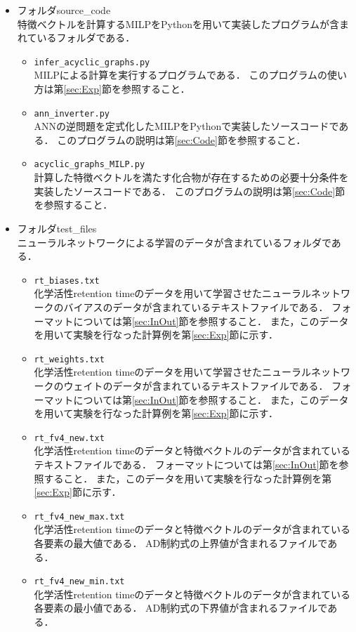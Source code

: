 \documentclass[11pt,titlepage,dvipdfmx,twoside]{jarticle}
\begin{document}
\begin{itemize}

\item フォルダsource\_code\\
特徴ベクトルを計算するMILPをPythonを用いて実装したプログラムが含まれているフォルダである．
\begin{itemize}
\item {\tt infer\_acyclic\_graphs.py}\\
MILPによる計算を実行するプログラムである．
このプログラムの使い方は第\ref{sec:Exp}節を参照すること．
\item {\tt ann\_inverter.py}\\
ANNの逆問題を定式化したMILPをPythonで実装したソースコードである．
このプログラムの説明は第\ref{sec:Code}節を参照すること．
\item {\tt acyclic\_graphs\_MILP.py}\\
計算した特徴ベクトルを満たす化合物が存在するための必要十分条件を実装したソースコードである．
このプログラムの説明は第\ref{sec:Code}節を参照すること．
\end{itemize}

\item {フォルダ}test\_files\\
ニューラルネットワークによる学習のデータが含まれているフォルダである．
\begin{itemize}
\item {\tt rt\_biases.txt}\\
化学活性retention timeのデータを用いて学習させたニューラルネットワークのバイアスのデータが含まれているテキストファイルである．
フォーマットについては第\ref{sec:InOut}節を参照すること．
また，このデータを用いて実験を行なった計算例を第\ref{sec:Exp}節に示す．
\item {\tt rt\_weights.txt}\\
化学活性retention timeのデータを用いて学習させたニューラルネットワークのウェイトのデータが含まれているテキストファイルである．
フォーマットについては第\ref{sec:InOut}節を参照すること．
また，このデータを用いて実験を行なった計算例を第\ref{sec:Exp}節に示す．
\item {\tt rt\_fv4\_new.txt}\\
化学活性retention timeのデータと特徴ベクトルのデータが含まれているテキストファイルである．
フォーマットについては第\ref{sec:InOut}節を参照すること．
また，このデータを用いて実験を行なった計算例を第\ref{sec:Exp}節に示す．
\item {\tt rt\_fv4\_new\_max.txt}\\
化学活性retention timeのデータと特徴ベクトルのデータが含まれている各要素の最大値である．
AD制約式の上界値が含まれるファイルである．
\item {\tt rt\_fv4\_new\_min.txt}\\
化学活性retention timeのデータと特徴ベクトルのデータが含まれている各要素の最小値である．
AD制約式の下界値が含まれるファイルである．
\end{itemize}


\end{itemize}
\end{document}
